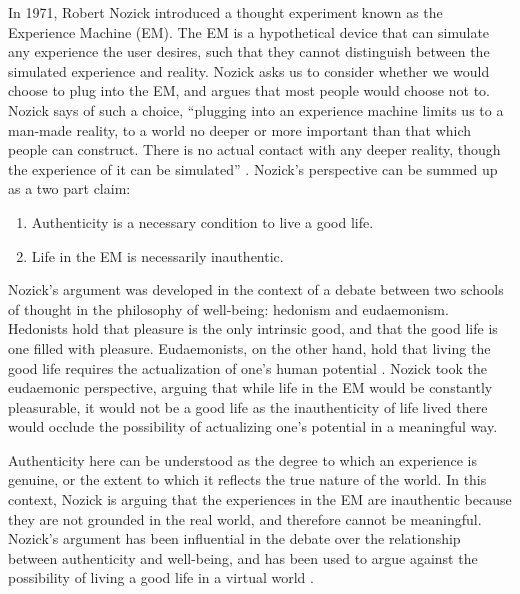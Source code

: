 In 1971, Robert Nozick introduced a thought experiment known as the Experience
Machine (EM). The EM is a hypothetical device that can simulate any experience
the user desires, such that they cannot distinguish between the simulated
experience and reality. Nozick asks us to consider whether we would choose to
plug into the EM, and argues that most people would choose not to. Nozick says 
of such a choice, ``plugging into an experience machine limits us to a man-made
reality, to a world no deeper or more important than that which people can
construct. There is no actual contact with any deeper reality, though the
experience of it can be simulated'' \citep{Nozick1974-NOZASA}. Nozick's 
perspective can be summed up as a two part claim:
\begin{enumerate}
    \item Authenticity is a necessary condition to live a good life.
    \item Life in the EM is necessarily inauthentic.
\end{enumerate}

Nozick's argument was developed in the context of a debate between two schools 
of thought in the philosophy of well-being: hedonism and eudaemonism. Hedonists
hold that pleasure is the only intrinsic good, and that the good life is one
filled with pleasure. Eudaemonists, on the other hand, hold that living the good
life requires the actualization of one's human potential \citep{Ryan_Deci_2001}.
Nozick took the eudaemonic perspective, arguing that while life in the EM would
be constantly pleasurable, it would not be a good life as the inauthenticity of
life lived there would occlude the possibility of actualizing one's potential in
a meaningful way.

Authenticity here can be understood as the degree to which an experience is
genuine, or the extent to which it reflects the true nature of the world. In
this context, Nozick is arguing that the experiences in the EM are inauthentic
because they are not grounded in the real world, and therefore cannot be
meaningful. Nozick's argument has been influential in the debate over the
relationship between authenticity and well-being, and has been used to argue
against the possibility of living a good life in a virtual world
\citep{Slater2020}.
